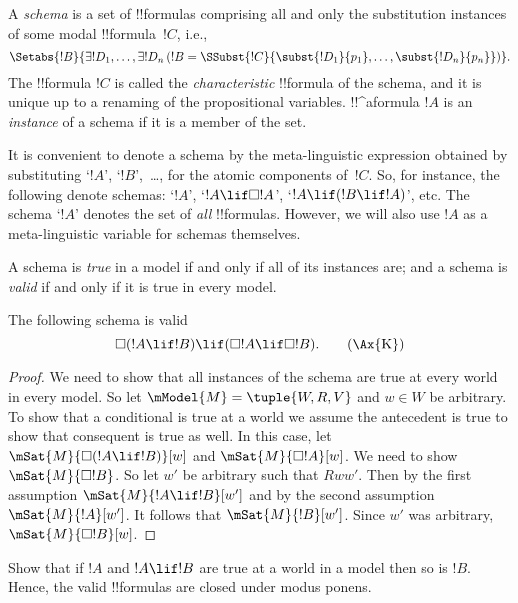 \documentclass[../../../include/open-logic-section]{subfiles}
\begin{document}


\begin{defn}
  A \emph{schema} is a set of !!{formula}s comprising all
  and only the substitution instances of some modal !!{formula}~$!C$, i.e.,
  \[
  \Setabs{!B}{\exists !D_1, \dots, \exists !D_n \left(!B =
  \SSubst{!C}{\subst{!D_1}{p_1}, \dots, \subst{!D_n}{p_n}} \right) }.
  \]
  The !!{formula} $!C$ is called the \emph{characteristic} !!{formula} of
  the schema, and it is unique up to a renaming of the propositional
  variables. !!^a{formula} $!A$ is an \emph{instance} of a schema if
  it is a member of the set.
\end{defn}

It is convenient to denote a schema by the meta-linguistic expression
obtained by substituting `$!A$', `$!B$',~\dots, for the atomic
components of~$!C$. So, for instance, the following denote schemas:
`$!A$', `$!A \lif \Box!A$', `$!A \lif (!B \lif !A)$', etc. The schema
`$!A$' denotes the set of \emph{all} !!{formula}s. However, we will
also use $!A$ as a meta-linguistic variable for schemas themselves.

\begin{defn}
  A schema is \emph{true} in a model if and only if all of its instances
  are; and a schema is \emph{valid} if and only if it is true in every
  model. 
\end{defn}

\begin{thm}
  The following schema  is valid
  \[
  \Box(!A \lif !B) \lif (\Box !A \lif \Box !B). \tag{\Ax{K}}
  \]
\end{thm}

\begin{proof}
  We need to show that all instances of the schema are true at every
  world in every model. So let $\mModel{M} = \tuple{W,R,V}$ and $w \in
  W$ be arbitrary. To show that a conditional is true at a world we
  assume the antecedent is true to show that consequent is true as
  well. In this case, let $\mSat{M}{\Box(!A \lif !B)}[w]$ and
  $\mSat{M}{\Box !A}[w]$. We need to show $\mSat{M}{\Box !B}$. So let
  $w'$ be arbitrary such that $Rww'$. Then by the first assumption
  $\mSat{M}{!A \lif !B}[w']$ and by the second assumption
  $\mSat{M}{!A}[w']$. It follows that $\mSat{M}{!B}[w']$. Since $w'$
  was arbitrary, $\mSat{M}{\Box !B}[w]$.
\end{proof}

\begin{prop}
  Show that if $!A$ and $!A \lif !B$ are true at a world in a model
  then so is $!B$. Hence, the valid !!{formula}s are closed under
  modus ponens.
\end{prop}
\end{document}
